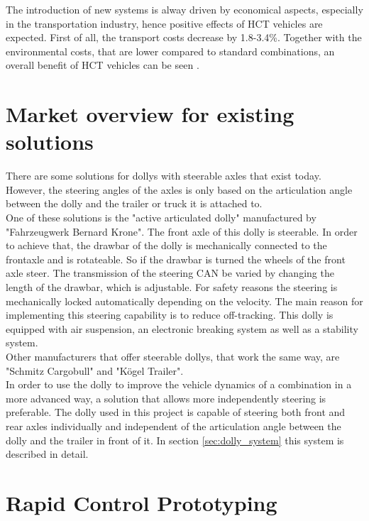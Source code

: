 \documentclass[ExampleMasters.tex]{subfiles}
\begin{document}
The introduction of new systems is alway driven by economical aspects, especially in the transportation industry, hence positive effects of \gls{HCT} vehicles are expected. First of all, the transport costs decrease by 1.8-3.4\%. Together with the environmental costs, that are lower compared to standard combinations, an overall benefit of \gls{HCT} vehicles can be seen \cite{EMS}.


\section{Market overview for existing solutions}
\label{sec:market_overview}
There are some solutions for dollys with steerable axles that exist today. However, the steering angles of the axles is only based on the articulation angle between the dolly and the trailer or truck it is attached to. \\
One of these solutions is the "active articulated dolly" manufactured by "Fahrzeugwerk Bernard Krone". The front axle of this dolly is steerable. In order to achieve that, the drawbar of the dolly is mechanically connected to the frontaxle and is rotateable. So if the drawbar is turned the wheels of the front axle steer. The transmission of the steering \gls{CAN} be varied by changing the length of the drawbar, which is adjustable. For safety reasons the steering is mechanically locked automatically depending on the velocity. The main reason for implementing this steering capability is to reduce off-tracking. This dolly is equipped with air suspension, an electronic breaking system as well as a stability system. \cite{Krone_dolly} \\
Other manufacturers that offer steerable dollys, that work the same way, are "Schmitz Cargobull" and "K{\"o}gel Trailer". \cite{Kogel_dolly}\cite{Schmitz_dolly} \\
In order to use the dolly to improve the vehicle dynamics of a  combination in a more advanced way, a solution that allows more independently steering is preferable. The dolly used in this project is capable of steering both front and rear axles individually and independent of the articulation angle between the dolly and the trailer in front of it. In section \ref{sec:dolly_system} this system is described in detail.


\section{Rapid Control Prototyping}
\label{sec:rapid_proto}
\end{document}
